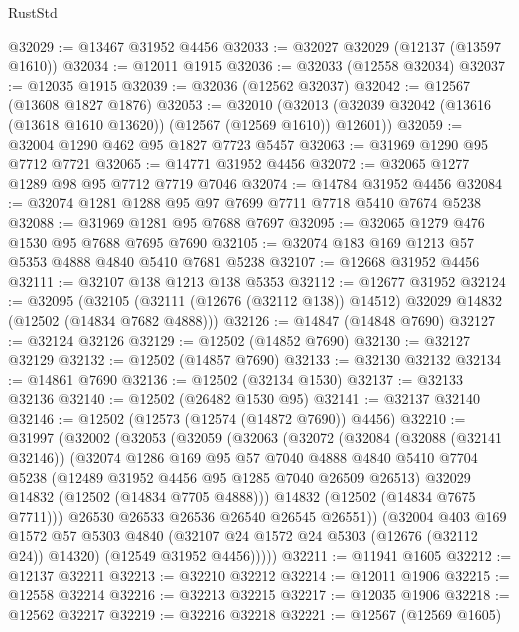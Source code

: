 \begin{lexlean}{RustStd}
\begin{coremodule}
@32029 := @13467 @31952 @4456
@32033 := @32027 @32029 (@12137 (@13597 @1610))
@32034 := @12011 @1915
@32036 := @32033 (@12558 @32034)
@32037 := @12035 @1915
@32039 := @32036 (@12562 @32037)
@32042 := @12567 (@13608 @1827 @1876)
@32053 := @32010
    (@32013 (@32039 @32042 (@13616 (@13618 @1610 @13620)) (@12567 (@12569 @1610)) @12601))
@32059 := @32004 @1290 @462 @95 @1827 @7723 @5457
@32063 := @31969 @1290 @95 @7712 @7721
@32065 := @14771 @31952 @4456
@32072 := @32065 @1277 @1289 @98 @95 @7712 @7719 @7046
@32074 := @14784 @31952 @4456
@32084 := @32074 @1281 @1288 @95 @97 @7699 @7711 @7718 @5410 @7674 @5238
@32088 := @31969 @1281 @95 @7688 @7697
@32095 := @32065 @1279 @476 @1530 @95 @7688 @7695 @7690
@32105 := @32074 @183 @169 @1213 @57 @5353 @4888 @4840 @5410 @7681 @5238
@32107 := @12668 @31952 @4456
@32111 := @32107 @138 @1213 @138 @5353
@32112 := @12677 @31952
@32124 := @32095
    (@32105 (@32111 (@12676 (@32112 @138)) @14512) @32029 @14832 (@12502 (@14834 @7682 @4888)))
@32126 := @14847 (@14848 @7690)
@32127 := @32124 @32126
@32129 := @12502 (@14852 @7690)
@32130 := @32127 @32129
@32132 := @12502 (@14857 @7690)
@32133 := @32130 @32132
@32134 := @14861 @7690
@32136 := @12502 (@32134 @1530)
@32137 := @32133 @32136
@32140 := @12502 (@26482 @1530 @95)
@32141 := @32137 @32140
@32146 := @12502 (@12573 (@12574 (@14872 @7690)) @4456)
@32210 := @31997
    (@32002
      (@32053
        (@32059
          (@32063
            (@32072
              (@32084
                (@32088 (@32141 @32146))
                (@32074
                  @1286
                  @169
                  @95
                  @57
                  @7040
                  @4888
                  @4840
                  @5410
                  @7704
                  @5238
                  (@12489 @31952 @4456 @95 @1285 @7040 @26509 @26513)
                  @32029
                  @14832
                  (@12502 (@14834 @7705 @4888)))
                @14832
                (@12502 (@14834 @7675 @7711)))
              @26530
              @26533
              @26536
              @26540
              @26545
              @26551))
          (@32004
            @403
            @169
            @1572
            @57
            @5303
            @4840
            (@32107 @24 @1572 @24 @5303 (@12676 (@32112 @24)) @14320)
            (@12549 @31952 @4456)))))
@32211 := @11941 @1605
@32212 := @12137 @32211
@32213 := @32210 @32212
@32214 := @12011 @1906
@32215 := @12558 @32214
@32216 := @32213 @32215
@32217 := @12035 @1906
@32218 := @12562 @32217
@32219 := @32216 @32218
@32221 := @12567 (@12569 @1605)

\end{coremodule}
\end{lexlean}
